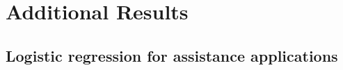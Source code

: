 
\section{Additional Results} \label{AppendixA}

\subsection{Logistic regression for assistance applications}



